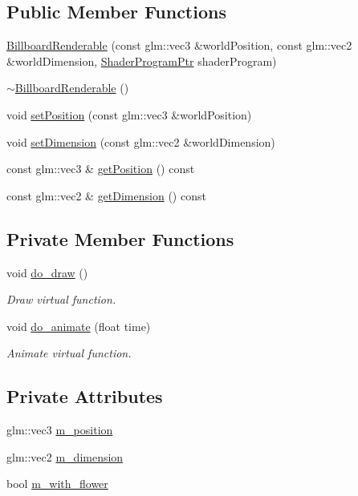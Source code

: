\subsection*{Public Member Functions}
\begin{DoxyCompactItemize}
\item 
\hyperlink{classBillboardRenderable_aa72988fabee4a462c6390625c664e79b}{Billboard\+Renderable} (const glm\+::vec3 \&world\+Position, const glm\+::vec2 \&world\+Dimension, \hyperlink{ShaderProgram_8hpp_af8e4af1ad4c53875ee5d32ab7e1f4966}{Shader\+Program\+Ptr} shader\+Program)
\item 
\hyperlink{classBillboardRenderable_a8f1ddb55c695fbc5d7a45f564932b328}{$\sim$\+Billboard\+Renderable} ()
\item 
void \hyperlink{classBillboardRenderable_a204c04b9ca009d0454a8ab8f6c19fbff}{set\+Position} (const glm\+::vec3 \&world\+Position)
\item 
void \hyperlink{classBillboardRenderable_a071366e85212a146bc43f64e9aa1fb5a}{set\+Dimension} (const glm\+::vec2 \&world\+Dimension)
\item 
const glm\+::vec3 \& \hyperlink{classBillboardRenderable_a981ea0b8383e18171fc56b3a1fa3c292}{get\+Position} () const 
\item 
const glm\+::vec2 \& \hyperlink{classBillboardRenderable_a2f6885a6285d6e5e8224901fa4d14cf8}{get\+Dimension} () const 
\end{DoxyCompactItemize}
\subsection*{Private Member Functions}
\begin{DoxyCompactItemize}
\item 
void \hyperlink{classBillboardRenderable_af3c5c220c558b0902acbbb5dd3f81174}{do\+\_\+draw} ()
\begin{DoxyCompactList}\small\item\em Draw virtual function. \end{DoxyCompactList}\item 
void \hyperlink{classBillboardRenderable_a99db8d2221571aed576e2f1e56ddc00e}{do\+\_\+animate} (float time)
\begin{DoxyCompactList}\small\item\em Animate virtual function. \end{DoxyCompactList}\end{DoxyCompactItemize}
\subsection*{Private Attributes}
\begin{DoxyCompactItemize}
\item 
glm\+::vec3 \hyperlink{classBillboardRenderable_aa0477db068d4c9a67aaa9031871ae8e4}{m\+\_\+position}
\item 
glm\+::vec2 \hyperlink{classBillboardRenderable_a69542c4170487272fea0bf0e207ca376}{m\+\_\+dimension}
\item 
bool \hyperlink{classBillboardRenderable_a9f034ff978eb852437ffa91cfcdc9b6e}{m\+\_\+with\+\_\+flower}
\end{DoxyCompactItemize}
